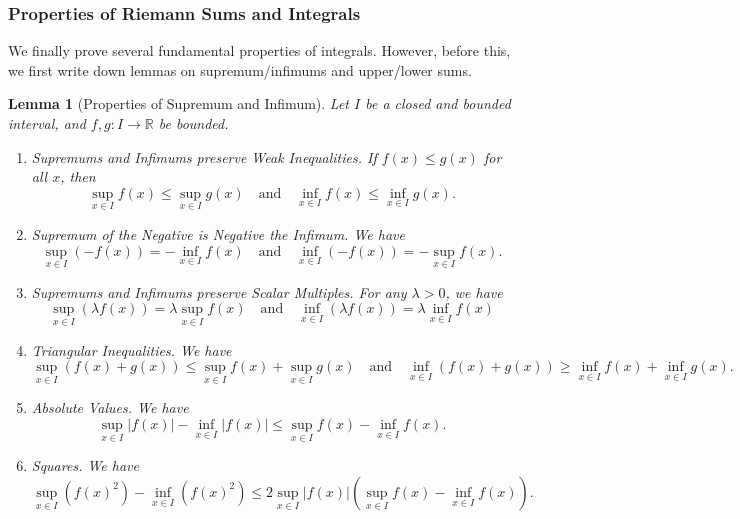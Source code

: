 \documentclass[11pt]{article}
\numberwithin{equation}{section}
\newtheorem{lemma}[theorem]{Lemma}
\theoremstyle{definition}
\theoremstyle{remark}
\newcommand{\pqty}[1]{\left(#1\right)}
\newcommand{\abs}[1]{\left|#1\right|}
\newcommand{\functiondomain}[3]{#1:#2\to #3}
\newcommand{\RR}{\mathbb R}
\newcommand{\qand}{\quad\text{and}\quad}
\begin{document}
\subsubsection{Properties of Riemann Sums and Integrals}

We finally prove several fundamental properties of integrals. However, before this, we first write down lemmas on supremum/infimums and upper/lower sums.

\begin{lemma}[Properties of Supremum and Infimum]\label{analysis-unit-0159}
    \label{lem:properties-supremum-infimum}%
    Let \(I\) be a closed and bounded interval, and \(\functiondomain{f, g}{I}{\RR}\) be bounded.

    \begin{enumerate}
        \item \textit{Supremums and Infimums preserve Weak Inequalities.} If \(f\pqty{x} \leq g\pqty{x}\) for all \(x\), then
        \[
            \sup_{x \in I} f\pqty{x} \leq \sup_{x \in I} g\pqty{x}
            \qand
            \inf_{x \in I} f\pqty{x} \leq \inf_{x \in I} g\pqty{x}.
        \]
        \item \textit{Supremum of the Negative is Negative the Infimum.} We have
        \[
            \sup_{x \in I} \pqty{-f\pqty{x}} = -\inf_{x \in I} f\pqty{x}
            \qand
            \inf_{x \in I} \pqty{-f\pqty{x}} = -\sup_{x \in I} f\pqty{x}.
        \]

        \item \textit{Supremums and Infimums preserve Scalar Multiples.} For any \(\lambda > 0\), we have
        \[
            \sup_{x \in I} \pqty{\lambda f\pqty{x}} = \lambda \sup_{x \in I} f\pqty{x}
            \qand
            \inf_{x \in I} \pqty{\lambda f\pqty{x}} = \lambda \inf_{x \in I} f\pqty{x}
        \]

        \item \textit{Triangular Inequalities.} We have
        \[
            \sup_{x \in I} \pqty{f\pqty{x} + g\pqty{x}} \leq \sup_{x \in I} f\pqty{x} + \sup_{x \in I} g\pqty{x}
            \qand
            \inf_{x \in I} \pqty{f\pqty{x} + g\pqty{x}} \geq \inf_{x \in I} f\pqty{x} + \inf_{x \in I} g\pqty{x}.
        \]
        
        \item \textit{Absolute Values.} We have
        \[
            \sup_{x \in I} \abs{f\pqty{x}} - \inf_{x \in I} \abs{f\pqty{x}} \leq \sup_{x \in I} f\pqty{x} - \inf_{x \in I} f\pqty{x}.
        \]

        \item \textit{Squares.} We have
        \[
            \sup_{x \in I} \pqty{f\pqty{x}^2} - \inf_{x \in I} \pqty{f\pqty{x}^2} \leq 2 \sup_{x \in I} \abs{f\pqty{x}} \pqty{\sup_{x \in I} f\pqty{x} - \inf_{x \in I} f\pqty{x}}.
        \]
    \end{enumerate}
\end{lemma}
\end{document}
